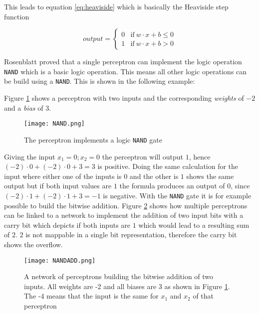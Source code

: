 This leads to equation \ref{eq:heaviside} which is basically the Heaviside step function

\begin{equation}\label{eq:heaviside}
output = \left\{\begin{matrix}
0 & \mathrm{if} \ w \cdot x + b\leq 0\\ 
1 & \mathrm{if} \ w \cdot x + b >  0
\end{matrix}\right.
\end{equation}

Rosenblatt proved that a single perceptron can implement the logic operation \texttt{NAND} which is a basic logic operation. 
This means all other logic operations can be build using a \texttt{NAND}. 
This is shown in the following example:

Figure \ref{fig:NAND} shows a perceptron with two inputs and the corresponding \emph{weights} of $-2$ and a \emph{bias} of 3.
\begin{figure}
\centering
  \texttt{[image: NAND.png]}
  \caption{The perceptron implements a logic \texttt{NAND} gate \cite{Nielsen2015}}
  \label{fig:NAND}
\end{figure}
Giving the input $x_1=0;x_2=0$ the perceptron will output $1$, hence $(-2) \cdot 0 + (-2) \cdot 0 + 3 = 3$ is positive. 
Doing the same calculation for the input where either one of the inputs is $0$ and the other is $1$ shows the same output but if both input values are $1$ the formula produces an output of $0$, since $(-2) \cdot 1 + (-2) \cdot 1 + 3 = -1$ is negative.
With the \texttt{NAND} gate it is for example possible to build the bitwise addition.
Figure \ref{fig:NANDADD} shows how multiple perceptrons can be linked to a network to implement the addition of two input bits with a carry bit which depicts if both inputs are $1$ which would lead to a resulting sum of $2$.
$2$ is not mappable in a single bit representation, therefore the carry bit shows the overflow.

\begin{figure}
\centering
  \texttt{[image: NANDADD.png]}
  \caption{A network of perceptrons building the bitwise addition of two inputs. All weights are -2 and all biases are 3 as shown in Figure \ref{fig:NAND}. The -4 means that the input is the same for $x_1$ and $x_2$ of that perceptron \cite{Nielsen2015}}
  \label{fig:NANDADD}
\end{figure}

